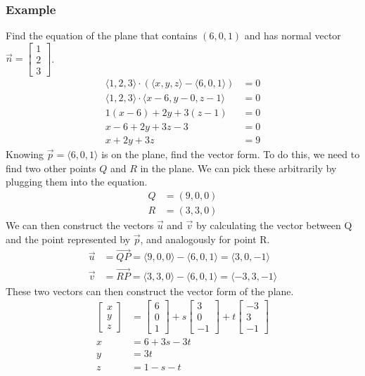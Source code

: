\documentclass{math}
\begin{document}
\subsubsection*{Example}
Find the equation of the plane that contains \( (6,0,1) \) and has normal vector
\( \vec{n} = \begin{bmatrix}1 \\ 2 \\ 3\end{bmatrix} \).
\begin{align*}
  \langle1,2,3\rangle\cdot(\langle x,y,z\rangle-\langle6,0,1\rangle) &= 0 \\
  \langle1,2,3\rangle\cdot\langle x-6,y-0,z-1\rangle &= 0 \\
  1(x-6)+2y+3(z-1) &= 0 \\
  x-6+2y+3z-3 &= 0 \\
  x+2y+3z &= 9
\end{align*}
Knowing \( \vec{p} = \langle6,0,1\rangle \) is on the plane, find the vector
form. To do this, we need to find two other points \( Q \) and \( R \) in the
plane. We can pick these arbitrarily by plugging them into the equation.
\begin{align*}
  Q &= (9,0,0) \\
  R &= (3,3,0)
\end{align*}
We can then construct the vectors \( \vec{u} \) and \( \vec{v} \) by calculating
the vector between Q and the point represented by \( \vec{p} \), and analogously
for point R.
\begin{align*}
  \vec{u} &= \overrightarrow{QP} = \langle9,0,0\rangle-\langle6,0,1\rangle =
    \langle3,0,-1\rangle \\
  \vec{v} &= \overrightarrow{RP} = \langle3,3,0\rangle-\langle6,0,1\rangle =
    \langle-3,3,-1\rangle
\end{align*}
These two vectors can then construct the vector form of the plane.
\begin{align*}
  \begin{bmatrix}x \\ y \\ z\end{bmatrix} &=
    \begin{bmatrix} 6 \\ 0 \\ 1\end{bmatrix}+
    s\begin{bmatrix}3 \\ 0 \\ -1\end{bmatrix}+
    t\begin{bmatrix}-3 \\ 3 \\ -1\end{bmatrix} \\
  x &= 6+3s-3t \\
  y &= 3t \\
  z &= 1-s-t
\end{align*}
\end{document}
